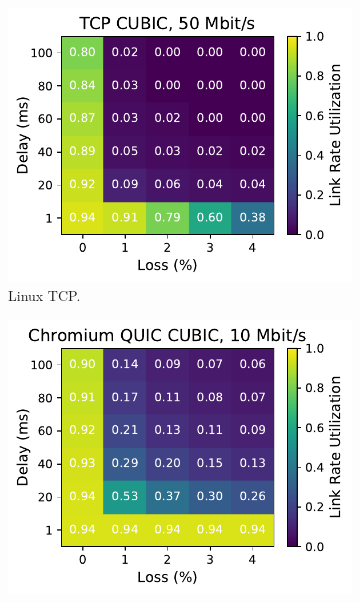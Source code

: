 \begin{figure}[ht]
\begin{subfigure}[b]{0.22\linewidth}
        \includegraphics[width=\linewidth,trim={0 0 2cm 0},clip]{splitting/figures/heatmaps/heatmap_tcp_cubic_50mbps.pdf}
        \caption{Linux TCP.}
    \end{subfigure}
    \begin{subfigure}[b]{0.22\linewidth}
        \includegraphics[width=\linewidth,trim={0 0 2cm 0},clip]{splitting/figures/heatmaps/heatmap_quic_cubic_10mbps.pdf}

\end{subfigure}
\end{figure}
